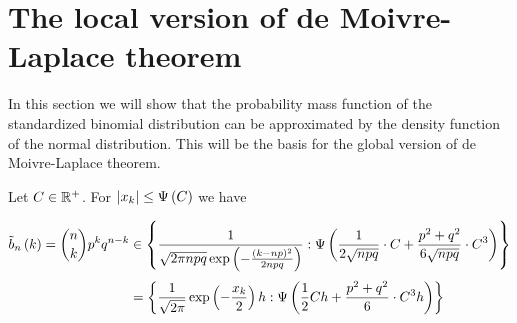 \section{The local version of de Moivre-Laplace theorem}

In this section we will show that the probability mass function of the standardized binomial distribution can be approximated by the density function of the normal distribution. This will be the basis for the global version of de Moivre-Laplace theorem.

\begin{theorem}
  Let $C \in \mathbb R^{+}$. For $\left|{x_{k}}\right| \le \Psi\left( {C} \right)$ we have

  \begin{align}
    \bb{k} = \binom nk p^k q^{n-k} & \in \ean[\bigpsi{\frac{1}{2\sqrt{npq}} \cdot C + \frac{p^2+q^2}{6\sqrt{npq}} \cdot C^3}]{\frac{1}{\sqrt{2\pi npq} \exp\left(-\frac{(k-np)^2}{2npq}\right)}} \nl
    & = \ean[\bigpsi{\frac{1}{2} Ch + \frac{p^2+q^2}{6} \cdot C^3h}]{\frac{1}{\sqrt{2\pi}} \exp\left(-\frac{\x}{2}\right) h}
  \end{align}
\end{theorem}

